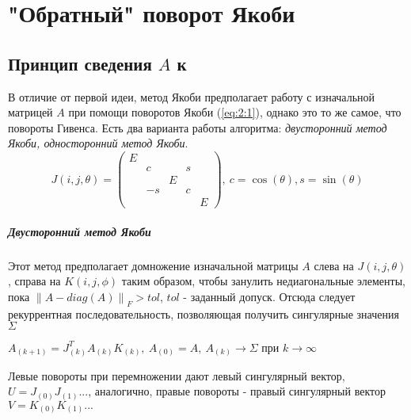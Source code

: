 \documentclass[12pt, a4paper]{report}
\theoremstyle{note}
\begin{document}
\chapter{"Обратный" поворот Якоби}

\section{Принцип сведения $A$ к \Sigma}
В отличие от первой идеи, метод Якоби предполагает работу с изначальной матрицей $A$ при помощи поворотов Якоби (\ref{eq:2:1}), однако это то же самое, что повороты Гивенса. Есть два варианта работы алгоритма:\textit{ двусторонний метод Якоби, односторонний метод Якоби}.
\begin{equation} \label{eq:2:1}
    J(i,j,\theta) = 
    \begin{pmatrix}E&&&&\\
        &c&&s\\
        &&E&&\\
        &-s&&c\\
        &&&&E
    \end{pmatrix},\
    c = \cos(\theta), s =\sin(\theta) 
\end{equation}
\paragraph{Двусторонний метод Якоби}
Этот метод предполагает домножение изначальной матрицы $A$ слева на $J(i,j,\theta)$, справа на $K(i,j,\phi)$ таким образом, чтобы занулить недиагональные элементы, пока $\left\| A - diag(A) \right\|_F > tol$, $tol$ - заданный допуск. 
Отсюда следует рекуррентная последовательность, позволяющая получить сингулярные значения $\Sigma$
\begin{center}
    $A_{(k+1)} = J^T_{(k)}A_{(k)}K_{(k)}, \ A_{(0)}= A, \ A_{(k)}\longrightarrow\Sigma \text{ при } k\to\infty$
\end{center}

Левые повороты при перемножении дают левый сингулярный вектор, $U=J_{(0)}J_{(1)}...$, аналогично, правые повороты - правый сингулярный вектор $V=K_{(0)}K_{(1)}...$
\end{document}
